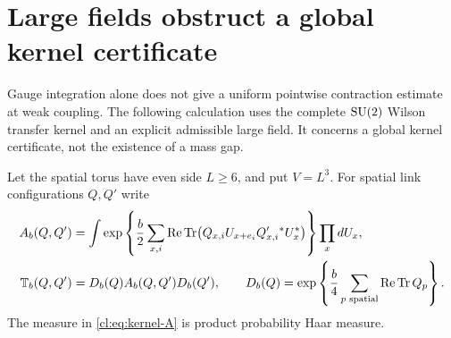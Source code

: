 \section{Large fields obstruct a global kernel certificate}\label{cl:sec:kernel}

Gauge integration alone does not give a uniform pointwise contraction
estimate at weak coupling. The following calculation uses the complete
$\mathrm{SU}(2)$ Wilson transfer kernel and an explicit admissible large field.
It concerns a global kernel certificate, not the existence of a mass gap.

Let the spatial torus have even side $L\ge6$, and put $V=L^3$.
For spatial link configurations $Q,Q'$ write
\begin{align}
A_b(Q,Q')&=\int\exp\left\{\frac b2\sum_{x,i}
\operatorname{Re}\operatorname{Tr}\bigl(Q_{x,i}U_{x+e_i}Q_{x,i}'{}^*U_x^*\bigr)\right\}
\prod_xdU_x,\label{cl:eq:kernel-A}\\
\mathbb T_b(Q,Q')&=D_b(Q)A_b(Q,Q')D_b(Q'),\qquad
D_b(Q)=\exp\left\{\frac b4\sum_{p\text{ spatial}}\operatorname{Re}\operatorname{Tr} Q_p\right\}.
\end{align}
The measure in \eqref{cl:eq:kernel-A} is product probability Haar measure.
